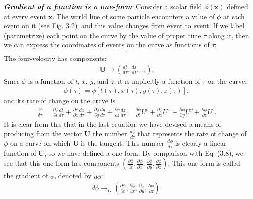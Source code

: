\documentclass[11pt,letterpaper]{book}
\begin{document}
    \textit{\textbf{Gradient of a function is a one-form}}: Consider a scalar field \(\phi(\mathbf{x})\) defined at every event \(\mathbf{x}\). The world line of some particle encounters a value of \(\phi\) at each event on it (see Fig. 3.2), and this value changes from event to event. If we label (parametrize) each point on the curve by the value of proper time \(\tau\) along it, then we can express the coordinates of events on the curve as functions of \(\tau\):
    \begin{align}
    [t = t(\tau), x = x(\tau), y = y(\tau), z = z(\tau)].
    \end{align}
    The four-velocity has components:
    \begin{align}
    \mathbf{U} \rightarrow \left(\frac{d t}{d\tau}, \frac{d x}{d\tau}, \ldots\right).
    \end{align}
    Since \(\phi\) is a function of \(t\), \(x\), \(y\), and \(z\), it is implicitly a function of \(\tau\) on the curve:
    \begin{align}
    \phi(\tau) = \phi[t(\tau), x(\tau), y(\tau), z(\tau)],
    \end{align}
    and its rate of change on the curve is
    \begin{align}
    \frac{d\phi}{d\tau} = \frac{\partial \phi}{\partial t} \frac{d t}{d\tau}
    + \frac{\partial \phi}{\partial x} \frac{d x}{d\tau}
    + \frac{\partial \phi}{\partial y} \frac{d y}{d\tau}
    + \frac{\partial \phi}{\partial z} \frac{d z}{d\tau}
    = \frac{\partial \phi}{\partial t} U^t + \frac{\partial \phi}{\partial x} U^x + \frac{\partial \phi}{\partial y} U^y + \frac{\partial \phi}{\partial z} U^z. \tag{3.14}
    \end{align}
    It is clear from this that in the last equation we have devised a means of producing from the vector \(\mathbf{U}\) the number \( \frac{d\phi}{d\tau} \) that represents the rate of change of \(\phi\) on a curve on which \(\mathbf{U}\) is the tangent. This number \( \frac{d\phi}{d\tau} \) is clearly a linear function of \(\mathbf{U}\), so we have defined a one-form. 
    By comparison with Eq. (3.8), we see that this one-form has components \(\left(\frac{\partial \phi}{\partial t}, \frac{\partial \phi}{\partial x}, \frac{\partial \phi}{\partial y}, \frac{\partial \phi}{\partial z}\right)\). This one-form is called the gradient of \(\phi\), denoted by \(\tilde{d}\phi\):
    \begin{align}
    \tilde{d}\phi \rightarrow_O \left(\frac{\partial \phi}{\partial t}, \frac{\partial \phi}{\partial x}, \frac{\partial \phi}{\partial y}, \frac{\partial \phi}{\partial z}\right). \tag{3.15}
    \end{align}
\end{document}
